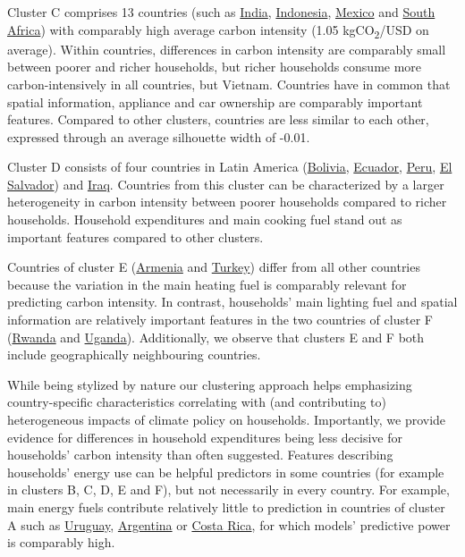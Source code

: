 \documentclass[12pt, a4paper]{article}
\begin{document}
Cluster C comprises 13 countries (such as \hyperref[fig:5b_IND]{India}, \hyperref[fig:5b_IDN]{Indonesia}, \hyperref[fig:5b_MEX]{Mexico} and \hyperref[fig:5b_ZAF]{South Africa}) with comparably high average carbon intensity (1.05 kgCO\textsubscript{2}/USD on average). Within countries, differences in carbon intensity are comparably small between poorer and richer households, but richer households consume more carbon-intensively in all countries, but Vietnam. Countries have in common that spatial information, appliance and car ownership are comparably important features. Compared to other clusters, countries are less similar to each other, expressed through an average silhouette width of -0.01. 

Cluster D consists of four countries in Latin America (\hyperref[fig:5b_BOL]{Bolivia}, \hyperref[fig:5b_ECU]{Ecuador}, \hyperref[fig:5b_PER]{Peru}, \hyperref[fig:5b_SLV]{El Salvador}) and \hyperref[fig:5b_IRQ]{Iraq}. Countries from this cluster can be characterized by a larger heterogeneity in carbon intensity between poorer households compared to richer households. Household expenditures and main cooking fuel stand out as important features compared to other clusters. 

Countries of cluster E (\hyperref[fig:5b_ARM]{Armenia} and \hyperref[fig:5b_TUR]{Turkey}) differ from all other countries because the variation in the main heating fuel is comparably relevant for predicting carbon intensity. In contrast, households' main lighting fuel and spatial information are relatively important features in the two countries of cluster F (\hyperref[fig:5b_RWA]{Rwanda} and \hyperref[fig:5b_UGA]{Uganda}). Additionally, we observe that clusters E and F both include geographically neighbouring countries.

While being stylized by nature our clustering approach helps emphasizing country-specific characteristics correlating with (and contributing to) heterogeneous impacts of climate policy on households. Importantly, we provide evidence for differences in household expenditures being less decisive for households' carbon intensity than often suggested. Features describing households' energy use can be helpful predictors in some countries (for example in clusters B, C, D, E and F), but not necessarily in every country. For example, main energy fuels contribute relatively little to prediction in countries of cluster A such as \hyperref[fig:5b_URY]{Uruguay}, \hyperref[fig:5b_URY]{Argentina} or \hyperref[fig:5b_CRI]{Costa Rica}, for which models' predictive power is comparably high.
\end{document}
